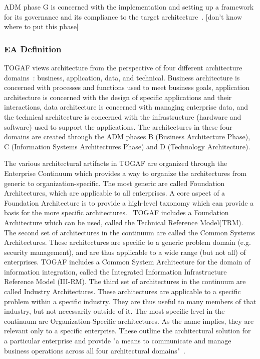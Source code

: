 ADM phase G is concerned with the implementation and setting up a framework for its governance and its compliance to the target architecture~\cite{togaf9.1}. [don't know where to put this phase]

\subsubsection{EA Definition}
TOGAF views architecture from the perspective of four different architecture domains~\cite{sessions2007}: business, application, data, and technical. Business architecture is concerned with processes and functions used to meet business goals, application architecture is concerned with the design of specific applications and their interactions, data architecture is concerned with managing enterprise data, and the technical architecture is concerned with the infrastructure (hardware and software) used to support the applications. The architectures in these four domains are created through the ADM phases B (Business Architecture Phase), C (Information Systems Architectures Phase) and D (Technology Architecture).

The various architectural artifacts in TOGAF are organized through the Enterprise Continuum which provides a way to organize the architectures from generic to organization-specific. The most generic are called Foundation Architectures, which are applicable to all enterprises. A core aspect of a Foundation Architecture is to provide a high-level taxonomy which can provide a basis for the more specific architectures.~\cite{togaf9.1} TOGAF includes a Foundation Architecture which can be used, called the Technical Reference Model(TRM). The second set of architectures in the continuum are called the Common Systems Architectures. These architectures are specific to a generic problem domain (e.g. security management), and are thus applicable to a wide range (but not all) of enterprises. TOGAF includes a Common System Architecture for the domain of information integration, called the Integrated Information Infrastructure Reference Model (III-RM). The third set of architectures in the continuum are called Industry Architectures. These architectures are applicable to a specific problem within a specific industry. They are thus useful to many members of that industry, but not necessarily outside of it. The most specific level in the continuum are Organization-Specific  architectures. As the name implies, they are relevant only to a specific enterprise. These outline the architectural solution for a particular enterprise and provide "a means to communicate and manage business operations across all four architectural domains"~\cite{togaf9.1}.

